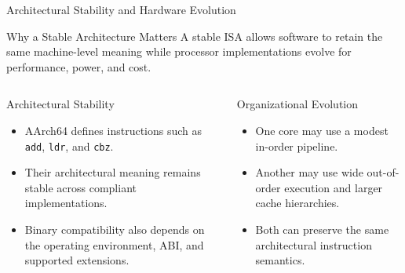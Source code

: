 \documentclass[aspectratio=169,11pt,t]{beamer}
\newcommand{\code}[1]{\texttt{#1}}
\begin{document}
\begin{frame}{Architectural Stability and Hardware Evolution}

\small

\begin{block}{Why a Stable Architecture Matters}
A stable ISA allows software
to retain the same machine-level meaning
while processor implementations evolve
for performance,
power,
and cost.
\end{block}

\vspace{0.12cm}

\begin{columns}[T,onlytextwidth]


\begin{block}{Architectural Stability}

\begin{itemize}
  \item AArch64 defines instructions
        such as
        \code{add},
        \code{ldr},
        and \code{cbz}.
  \item Their architectural meaning
        remains stable
        across compliant implementations.
  \item Binary compatibility also depends on
        the operating environment,
        ABI,
        and supported extensions.
\end{itemize}

\end{block}


\begin{block}{Organizational Evolution}

\begin{itemize}
  \item One core may use
        a modest in-order pipeline.
  \item Another may use
        wide out-of-order execution
        and larger cache hierarchies.
  \item Both can preserve
        the same architectural
        instruction semantics.
\end{itemize}

\end{block}

\end{columns}

\end{frame}
\end{document}

